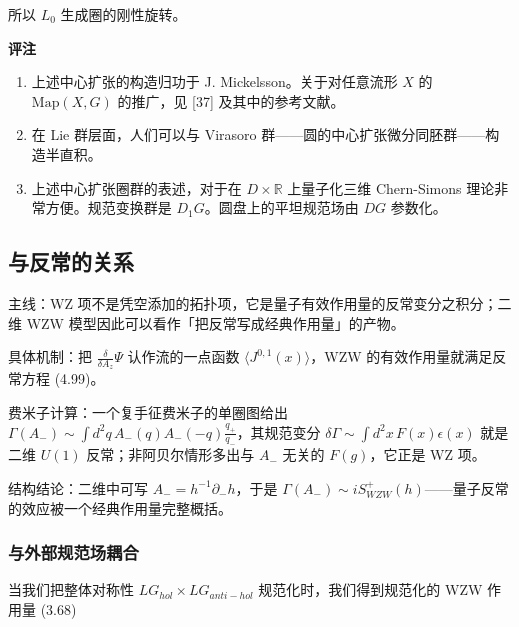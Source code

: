 所以 $L_0$ 生成圈的刚性旋转。

\textbf{评注}

\begin{enumerate}
  \item 上述中心扩张的构造归功于 J. Mickelsson。关于对任意流形 $X$ 的 $\mathrm{Map}(X,G)$ 的推广，见 [37] 及其中的参考文献。
  \item 在 Lie 群层面，人们可以与 Virasoro 群——圆的中心扩张微分同胚群——构造半直积。
  \item 上述中心扩张圈群的表述，对于在 $D\times\mathbb{R}$ 上量子化三维 Chern-Simons 理论非常方便。规范变换群是 $D_1G$。圆盘上的平坦规范场由 $DG$ 参数化。
\end{enumerate}


\subsection{与反常的关系} %

\begin{keytakeaways}
  \item 主线：WZ 项不是凭空添加的拓扑项，它是量子有效作用量的反常变分之积分；二维 WZW 模型因此可以看作「把反常写成经典作用量」的产物。
  \item 具体机制：把 $\frac{\delta}{\delta A_z}\Psi$ 认作流的一点函数 $\langle J^{0,1}(x)\rangle$，WZW 的有效作用量就满足反常方程 (4.99)。
  \item 费米子计算：一个复手征费米子的单圈图给出 $\Gamma(A_-)\sim\int d^2q\,A_-(q)A_-(-q)\frac{q_+}{q_-}$，其规范变分 $\delta\Gamma\sim\int d^2x\,F(x)\epsilon(x)$ 就是二维 $U(1)$ 反常；非阿贝尔情形多出与 $A_-$ 无关的 $F(g)$，它正是 WZ 项。
  \item 结构结论：二维中可写 $A_-=h^{-1}\partial_-h$，于是 $\Gamma(A_-)\sim iS^+_{WZW}(h)$——量子反常的效应被一个经典作用量完整概括。
\end{keytakeaways}

\subsubsection{与外部规范场耦合} %

当我们把整体对称性 $LG_{hol}\times LG_{anti-hol}$ 规范化时，我们得到规范化的 WZW 作用量 (3.68)

